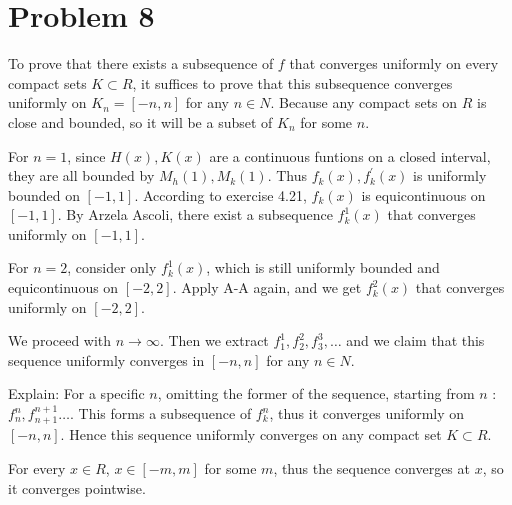 \documentclass{report}
\begin{document}
    \section*{Problem 8}
    To prove that there exists a subsequence of $f$ that converges uniformly on every compact
    sets $K \subset R$, it suffices to prove that this subsequence converges uniformly 
    on $K_n = [-n, n]$ for any $n \in N$. Because any compact sets on $R$ is close and bounded,
    so it will be a subset of $K_n$ for some $n$.

    For $n = 1$, since $H(x), K(x)$ are a continuous funtions on a closed interval,
    they are all bounded by $M_h(1), M_k(1)$. Thus $f_k(x), f_k^\prime(x)$ is uniformly bounded on 
    $[-1, 1]$. According to exercise 4.21, $f_k(x)$ is equicontinuous on $[-1, 1]$. By 
    Arzela Ascoli, there exist a subsequence $f_k^1(x)$ that converges uniformly on $[-1, 1]$.

    For $n = 2$, consider only $f_k^1(x)$, which is still uniformly bounded and equicontinuous
    on $[-2,2]$. Apply A-A again, and we get $f_k^2(x)$ that converges uniformly on $[-2, 2]$.

    We proceed with $n \to \infty$. Then we extract $f_1^1, f_2^2, f_3^3, \ldots$ and we claim
    that this sequence uniformly converges in $[-n, n]$ for any $n \in N$. 
    
    Explain:
    For a specific $n$, omitting the former of the sequence, starting from $n$ : 
    $f_n^n, f_{n+1}^{n+1} \ldots$. This forms a subsequence of $f_k^n$, thus it converges 
    uniformly on $[-n, n]$. Hence this sequence uniformly converges on 
    any compact set $K \subset R$.

    For every $x \in R$, $x \in [-m, m]$ for some $m$, thus the sequence converges at $x$,
    so it converges pointwise.

    
\end{document}
